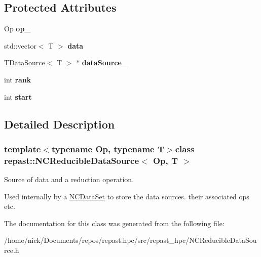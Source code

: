 \subsection*{Protected Attributes}
\begin{DoxyCompactItemize}
\item 
\hypertarget{classrepast_1_1_n_c_reducible_data_source_aa5cd25f8ad028a775dc7627c5c91587d}{Op {\bfseries op\-\_\-}}\label{classrepast_1_1_n_c_reducible_data_source_aa5cd25f8ad028a775dc7627c5c91587d}

\item 
\hypertarget{classrepast_1_1_n_c_reducible_data_source_a9685203ae48080b54fa0203e891b54ae}{std\-::vector$<$ T $>$ {\bfseries data}}\label{classrepast_1_1_n_c_reducible_data_source_a9685203ae48080b54fa0203e891b54ae}

\item 
\hypertarget{classrepast_1_1_n_c_reducible_data_source_a5b8b75d2e197c52368b4ccc81f71ed90}{\hyperlink{classrepast_1_1_t_data_source}{T\-Data\-Source}$<$ T $>$ $\ast$ {\bfseries data\-Source\-\_\-}}\label{classrepast_1_1_n_c_reducible_data_source_a5b8b75d2e197c52368b4ccc81f71ed90}

\item 
\hypertarget{classrepast_1_1_n_c_reducible_data_source_a02d3aaeda5a9d70dc599da7b01401668}{int {\bfseries rank}}\label{classrepast_1_1_n_c_reducible_data_source_a02d3aaeda5a9d70dc599da7b01401668}

\item 
\hypertarget{classrepast_1_1_n_c_reducible_data_source_a4a94e07fac10264e228eef6a6f25de83}{int {\bfseries start}}\label{classrepast_1_1_n_c_reducible_data_source_a4a94e07fac10264e228eef6a6f25de83}

\end{DoxyCompactItemize}


\subsection{Detailed Description}
\subsubsection*{template$<$typename Op, typename T$>$class repast\-::\-N\-C\-Reducible\-Data\-Source$<$ Op, T $>$}

Source of data and a reduction operation. 

Used internally by a \hyperlink{classrepast_1_1_n_c_data_set}{N\-C\-Data\-Set} to store the data sources. their associated ops etc. 

The documentation for this class was generated from the following file\-:\begin{DoxyCompactItemize}
\item 
/home/nick/\-Documents/repos/repast.\-hpc/src/repast\-\_\-hpc/N\-C\-Reducible\-Data\-Source.\-h\end{DoxyCompactItemize}
